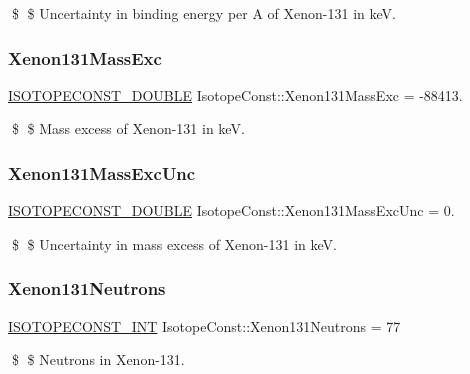 \$ \$ Uncertainty in binding energy per A of Xenon-\/131 in keV. \mbox{\label{group___isotope_const-_xenon-_xe131_gaf0962fe7cd9bf8ae673c7ad707e0a6be}} 
\subsubsection{\texorpdfstring{Xenon131\+Mass\+Exc}{Xenon131MassExc}}
{\footnotesize\ttfamily \mbox{\hyperlink{group___isotope_const-_macros_ga8f45a7272ce02c0b4c65c44636ed719a}{I\+S\+O\+T\+O\+P\+E\+C\+O\+N\+S\+T\+\_\+\+D\+O\+U\+B\+LE}} Isotope\+Const\+::\+Xenon131\+Mass\+Exc = -\/88413.}

\$ \$ Mass excess of Xenon-\/131 in keV. \mbox{\label{group___isotope_const-_xenon-_xe131_gaf992897dfd43c40af7bd6f1a9f004b29}} 
\subsubsection{\texorpdfstring{Xenon131\+Mass\+Exc\+Unc}{Xenon131MassExcUnc}}
{\footnotesize\ttfamily \mbox{\hyperlink{group___isotope_const-_macros_ga8f45a7272ce02c0b4c65c44636ed719a}{I\+S\+O\+T\+O\+P\+E\+C\+O\+N\+S\+T\+\_\+\+D\+O\+U\+B\+LE}} Isotope\+Const\+::\+Xenon131\+Mass\+Exc\+Unc = 0.}

\$ \$ Uncertainty in mass excess of Xenon-\/131 in keV. \mbox{\label{group___isotope_const-_xenon-_xe131_ga78ff951824d556ac46b4020f49fbe52f}} 
\subsubsection{\texorpdfstring{Xenon131\+Neutrons}{Xenon131Neutrons}}
{\footnotesize\ttfamily \mbox{\hyperlink{group___isotope_const-_macros_ga5f18360b3e99483a35c32d789e62621c}{I\+S\+O\+T\+O\+P\+E\+C\+O\+N\+S\+T\+\_\+\+I\+NT}} Isotope\+Const\+::\+Xenon131\+Neutrons = 77}

\$ \$ Neutrons in Xenon-\/131. \mbox{\label{group___isotope_const-_xenon-_xe131_gadc6a9bbe6d479290b808cc0475899ef7}} 
